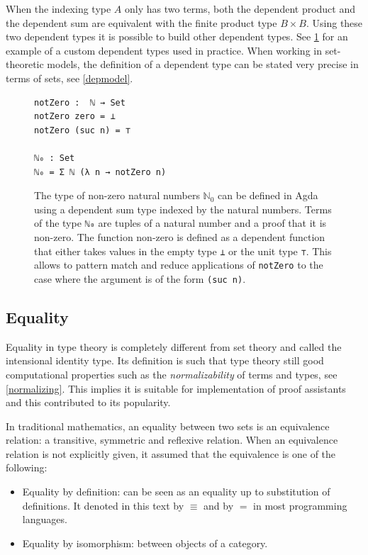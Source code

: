 \documentclass[12pt,a4paper,twoside,xetex]{book} %
\newcommand{\keyword}[1]{\emph{#1}\index{#1}}
\begin{document}
When the indexing type $A$ only has two terms, both the dependent product and the dependent sum 
are equivalent with the finite product type $B \times B$. Using these two 
dependent types it is possible to build other dependent types. See 
\cref{non-zeroNats} for an example of a custom dependent types used in practice. 
When working in set-theoretic models, the definition of a dependent type can be 
stated very precise in terms of sets, see \cref{depmodel}.

\begin{figure}\label{non-zeroNats}
\centering
\begin{BVerbatim}
notZero :  ℕ → Set
notZero zero = ⊥
notZero (suc n) = ⊤

ℕ₀ : Set
ℕ₀ = Σ ℕ (λ n → notZero n)
\end{BVerbatim}
\caption{The type of non-zero natural numbers $\mathbb{N}_0$ can be defined in 
Agda using a dependent sum type indexed by the natural numbers. Terms of the 
type \texttt{ℕ₀} are tuples of a natural number and a proof that it is 
non-zero. The function non-zero is defined as a dependent function that either takes values in the empty type \texttt{⊥} or the unit type \texttt{⊤}. This allows to pattern match and reduce applications of \texttt{notZero} to the case where the argument is of the form \texttt{(suc n)}.}
\end{figure}


\subsection{Equality}


Equality in type theory is completely different from set theory and called the intensional identity type. Its definition is such that type theory still good computational properties such as the \keyword{normalizability} of terms and types, see \cref{normalizing}. This implies it is suitable for implementation of proof assistants and this contributed to its popularity. 

In traditional mathematics, an equality between two sets is an equivalence relation: a transitive, symmetric and reflexive relation. When an equivalence relation is not explicitly given, it assumed that the equivalence is one of the following: 

\begin{itemize}
 \item Equality by definition: can be seen as an equality up to substitution 
of definitions. It denoted in this text by $\equiv$ and by $=$ in most programming languages.
 \item Equality by isomorphism: between objects of a category.
\end{itemize}
\end{document}
